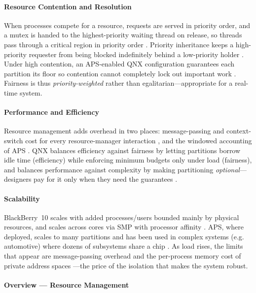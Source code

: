 \paragraph{Resource Contention and Resolution}

When processes compete for a resource, requests are served in priority
order, and a mutex is handed to the highest-priority waiting thread on
release, so threads pass through a critical region in priority order
\citep{qnx_kernel_sysarch}. Priority inheritance keeps a high-priority
requester from being blocked indefinitely behind a low-priority holder
\citep{qnx_ipc}. Under high contention, an APS-enabled QNX configuration guarantees
each partition its floor so contention cannot completely lock out
important work \citep{qnx_aps}. Fairness is thus \emph{priority-weighted} rather than
egalitarian---appropriate for a real-time system.

\paragraph{Performance and Efficiency}

Resource management adds overhead in two places: message-passing and
context-switch cost for every resource-manager interaction
\citep{qnx_arm_memory}, and the windowed accounting of APS
\citep{qnx_aps_cpu_percent}. QNX balances efficiency against fairness
by letting partitions borrow idle time (efficiency) while enforcing
minimum budgets only under load (fairness), and balances performance
against complexity by making partitioning \emph{optional}---designers
pay for it only when they need the guarantees \citep{qnx_aps}.

\paragraph{Scalability}

BlackBerry~10 scales with added processes/users bounded mainly by
physical resources, and scales across cores via SMP with processor
affinity \citep{qnx_smp_multicore}. APS, where deployed, scales to many
partitions and has been used in complex systems (e.g. automotive) where
dozens of subsystems share a chip \citep{qnx_aps}. As
load rises, the limits that appear are message-passing overhead and
the per-process memory cost of private address spaces
\citep{qnx_memman, qnx_arm_memory}---the price of the isolation that
makes the system robust.

\paragraph{Overview --- Resource Management}


